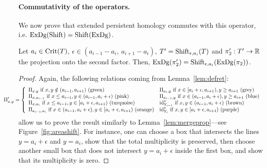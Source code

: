 \paragraph*{Commutativity of the operators.} We now prove %
that extended persistent homology commutes with this operator, i.e.
$\mathrm{ExDg}(\mathrm{Shift})=\mathrm{Shift}(\mathrm{ExDg})$.


\begin{lem}
\label{lem:shiftprop}
Let $a_i\in\mathrm{Crit}(T)$,  $\epsilon\in \left(a_{i-1}-
a_i,\ a_{i+1}-a_i\right)$, $T'=\mathrm{Shift}_{\epsilon,a_i}(T)$
and $\pi_2':T'\rightarrow\mathbb{R}$ the projection onto the second factor.
Then, $\mathrm{ExDg}(\pi_2')=\mathrm{Shift}_{\epsilon,a_i}(\mathrm{ExDg}(\pi_2))$.
\end{lem}

\begin{proof}
Again, the following relations coming from Lemma~\ref{lem:defret}:
%
\[\hspace{-1cm} \Pi'_{x,y}=\left\{ 
\begin{array}{ll}    
\Pi_{x,y}\text{ if }x,y\notin(a_{i-1},a_{i+1})\text{ (green)} & \Pi_{a_i,y}\text{ if }x\in[a_i+\epsilon,a_{i+1}),y\geq a_{i+1}\text{ (grey)} \\
\Pi_{x,a_{i-1}}\text{ if }x\leq a_{i-1},y\in(a_{i-1},a_i+\epsilon)\text{ (pink)} &  \Pi_{a_{i-1},y}\text{ if }x\in(a_{i-1},a_i+\epsilon), y\geq a_{i+1}\text{ (blue)} \\
\Pi_{x,a_i}\text{ if }x\leq a_{i-1},y\in[a_i+\epsilon,a_{i+1})\text{ (turquoise)} & \text{id}^*_{Y_{i-1}}\text{ if }x,y\in(a_{i-1},a_i+\epsilon)\text{ (brown)} \\
\Pi_{a_{i-1},a_i}\text{ if }x\in(a_{i-1},a_i+\epsilon),y\in[a_i+\epsilon,a_{i+1})\text{ (orange)} & \text{id}^*_{Y_i}\text{ if }x,y\in[a_i+\epsilon,a_{i+1})\text{ (purple)}				   
\end{array} \right. \]
%
allow us to prove the result similarly to
Lemma~\ref{lem:mergeprop}---see Figure~\ref{fig:areashift}.  For
instance, one can choose a box that intersects the lines
$y=a_i+\epsilon$ and $y=a_i$, show that the total multiplicity is
preserved, then choose another small box that does not intersect
$y=a_i+\epsilon$ inside the first box, and show that its multiplicity
is zero.


\end{proof}

